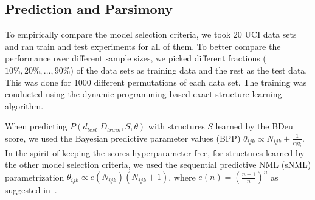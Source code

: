 \subsection{Prediction and Parsimony}

To empirically compare the model selection criteria, we took 20 UCI
data sets~\cite{Lichman:2013} and ran train and test experiments for
all of them. To better compare the performance over different sample
sizes, we picked different fractions ($10\%, 20\%, \ldots, 90\%$) of
the data sets as training data and the rest as the test data.
This was done for 1000 different permutations of each data set.
The training was conducted using the dynamic
programming based exact structure learning algorithm.

When predicting $P(d_{test}|D_{train},S,\theta)$
with structures $S$ learned by the BDeu score, we used the
Bayesian predictive parameter values (BPP) $\theta_{ijk} \propto
N_{ijk}+\frac{1}{r_iq_i}$.  In the spirit of keeping the scores
hyperparameter-free, for structures learned by the other model
selection criteria, we used the sequential predictive NML (sNML)
parametrization $\theta_{ijk}\propto e(N_{ijk})(N_{ijk}+1)$, where
$e(n)=(\frac{n+1}{n})^n$ as suggested in~\cite{Riss07b}.

